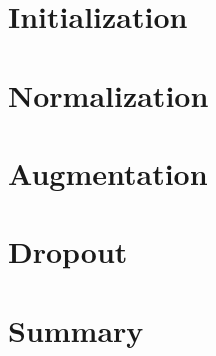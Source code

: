 \section{Initialization}

\section{Normalization}

\section{Augmentation}

\section{Dropout}

\section{Summary}